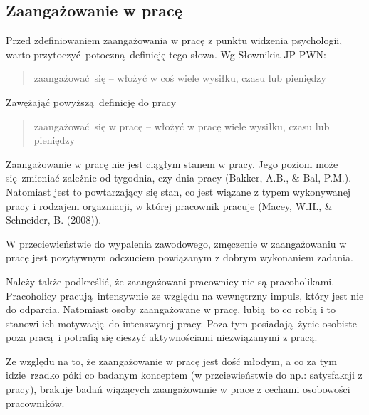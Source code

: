 \subsection{Zaangażowanie w pracę}
Przed zdefiniowaniem zaangażowania w pracę z punktu widzenia psychologii, warto przytoczyć potoczną definicję tego słowa. Wg Słownikia JP PWN:
\begin{quote}
zaangażować się -- włożyć w coś wiele wysiłku, czasu lub pieniędzy
\end{quote}
Zawężająć powyższą definicję do pracy
\begin{quote}
zaangażować się w pracę -- włożyć w pracę wiele wysiłku, czasu lub pieniędzy
\end{quote}

Zaangażowanie w pracę nie jest ciągłym stanem w pracy. Jego poziom może się zmieniać zależnie od tygodnia, czy dnia pracy (Bakker, A.B., \& Bal, P.M.). Natomiast jest to powtarzający się stan, co jest wiązane z typem wykonywanej pracy i rodzajem orgazniacji, w której pracownik pracuje (Macey, W.H., \& Schneider, B. (2008)).

W przeciewieństwie do wypalenia zawodowego, zmęczenie w zaangażowaniu w pracę jest pozytywnym odczuciem powiązanym z dobrym wykonaniem zadania.

Należy także podkreślić, że zaangażowani pracownicy nie są pracoholikami. Pracoholicy pracują intensywnie ze względu na wewnętrzny impuls, który jest nie do odparcia. Natomiast osoby zaangażowane w pracę, lubią to co robią i to stanowi ich motywację do intenswynej pracy. Poza tym posiadają życie osobiste poza pracą i potrafią się cieszyć aktywnościami niezwiązanymi z pracą.

Ze względu na to, że zaangażowanie w pracę jest dość młodym, a co za tym idzie rzadko póki co badanym konceptem (w przciewieństwie do np.: satysfakcji z pracy), brakuje badań wiążących zaangażowanie w prace z cechami osobowości pracowników.
